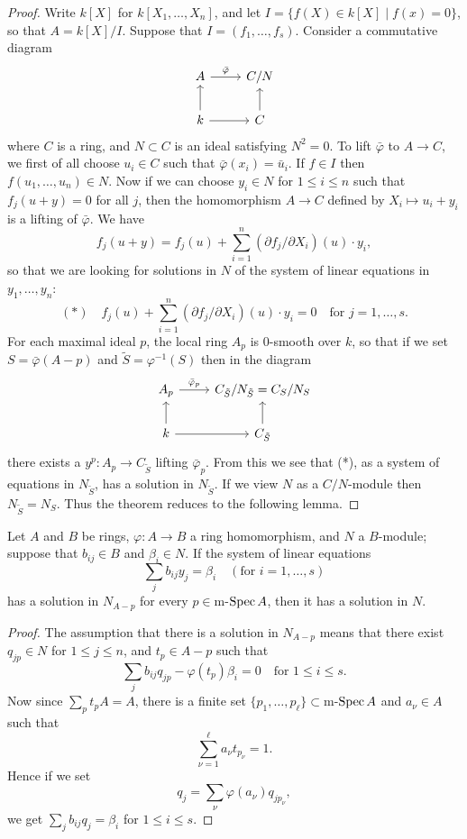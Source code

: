 \begin{proof}
Write $k[X]$ for $k[X_1, \ldots, X_n]$, and let $I = \{f(X) \in k[X] \mid f(x) = 0\}$, so
that $A = k[X]/I$. Suppose that $I = (f_1, \ldots, f_s)$. Consider a commutative diagram
\[
\begin{tikzcd}
A \arrow[r, "\bar{\varphi}"] & C/N \\
k \arrow[u] \arrow[r] & C \arrow[u]
\end{tikzcd}
\]
where $C$ is a ring, and $N \subset C$ is an ideal satisfying $N^2 = 0$. To lift
$\bar{\varphi}$ to $A \to C$, we first of all choose $u_i \in C$ such that
$\bar{\varphi}(x_i) = \bar{u}_i$. If $f \in I$ then $f(u_1, \ldots, u_n) \in N$. Now if we can choose
$y_i \in N$ for $1 \le i \le n$ such that $f_j(u + y) = 0$ for all $j$, then the
homomorphism $A \to C$ defined by $X_i \mapsto u_i + y_i$ is a lifting of
$\bar{\varphi}$. We have
\[
  f_j(u + y) = f_j(u) + \sum_{i=1}^{n} (\partial f_j/\partial X_i)(u) \cdot y_i,
\]
so that we are looking for solutions in $N$ of the system of linear equations in
$y_1, \ldots, y_n$:
\[
  (*) \quad f_j(u) + \sum_{i=1}^{n} (\partial f_j/\partial X_i)(u) \cdot y_i = 0
      \quad \text{for } j = 1, \ldots, s.
\]
For each maximal ideal $p$, the local ring $A_p$ is 0-smooth over $k$, so that if we
set $S = \bar{\varphi}(A - p)$ and $\tilde{S} = \varphi^{-1}(S)$ then in the diagram
\[
\begin{tikzcd}
A_p \arrow[r, "\bar{\varphi}_p"] & C_{\tilde{S}}/N_{\tilde{S}} = C_S/N_S \\
k \arrow[u] \arrow[r] & C_{\tilde{S}} \arrow[u]
\end{tikzcd}
\]
there exists a $y^p\colon A_p \to C_{\tilde{S}}$ lifting $\bar{\varphi}_p$. From this we see that (*), as
a system of equations in $N_{\tilde{S}}$, has a solution in $N_{\tilde{S}}$. If we view $N$ as a
$C/N$-module then $N_{\tilde{S}} = N_S$. Thus the theorem reduces to the following
lemma.
\end{proof}

\begin{lemma}\label{lem:30.1}
Let $A$ and $B$ be rings, $\varphi\colon A \to B$ a ring homomorphism, and $N$ a
$B$-module; suppose that $b_{ij} \in B$ and $\beta_i \in N$. If the system of linear
equations
\[
  \sum_j b_{ij}y_j = \beta_i \quad (\text{for } i = 1, \ldots, s)
\]
has a solution in $N_{A-p}$ for every $p \in \mathrm{m}$-$\operatorname{Spec} A$, then it has a solution in $N$.
\end{lemma}

\begin{proof}
The assumption that there is a solution in $N_{A-p}$ means that there exist
$q_{jp} \in N$ for $1 \le j \le n$, and $t_p \in A - p$ such that
\[
  \sum_j b_{ij}q_{jp} - \varphi(t_p)\beta_i = 0 \quad \text{for } 1 \le i \le s.
\]
Now since $\sum_p t_pA = A$, there is a finite set $\{p_1, \ldots, p_\ell\} \subset
\mathrm{m}$-$\operatorname{Spec} A$ and $a_\nu \in A$ such that
\[
  \sum_{\nu=1}^{\ell} a_\nu t_{p_\nu} = 1.
\]
Hence if we set
\[
  q_j = \sum_\nu \varphi(a_\nu)q_{jp_\nu},
\]
we get $\sum_j b_{ij}q_j = \beta_i$ for $1 \le i \le s$.
\end{proof}


